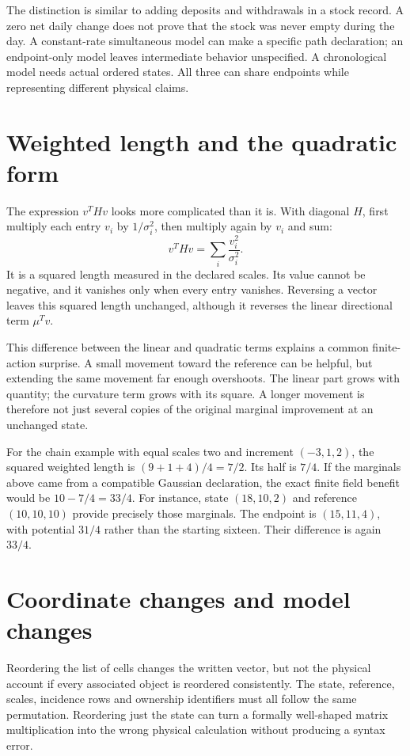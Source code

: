 The distinction is similar to adding deposits and withdrawals in a stock
record. A zero net daily change does not prove that the stock was never
empty during the day. A constant-rate simultaneous model can make a
specific path declaration; an endpoint-only model leaves intermediate
behavior unspecified. A chronological model needs actual ordered states.
All three can share endpoints while representing different physical claims.

\section{Weighted length and the quadratic form}
The expression $v^THv$ looks more complicated than it is. With diagonal
$H$, first multiply each entry $v_i$ by $1/\sigma_i^2$, then multiply
again by $v_i$ and sum:
\begin{equation}
 v^THv=\sum_i\frac{v_i^2}{\sigma_i^2}.
\end{equation}
It is a squared length measured in the declared scales. Its value cannot
be negative, and it vanishes only when every entry vanishes. Reversing a
vector leaves this squared length unchanged, although it reverses the
linear directional term $\mu^Tv$.

This difference between the linear and quadratic terms explains a common
finite-action surprise. A small movement toward the reference can be
helpful, but extending the same movement far enough overshoots. The linear
part grows with quantity; the curvature term grows with its square. A
longer movement is therefore not just several copies of the original
marginal improvement at an unchanged state.

For the chain example with equal scales two and increment $(-3,1,2)$,
the squared weighted length is $(9+1+4)/4=7/2$. Its half is $7/4$.
If the marginals above came from a compatible Gaussian declaration,
the exact finite field benefit would be $10-7/4=33/4$. For instance,
state $(18,10,2)$ and reference $(10,10,10)$ provide precisely those
marginals. The endpoint is $(15,11,4)$, with potential $31/4$ rather
than the starting sixteen. Their difference is again $33/4$.

\section{Coordinate changes and model changes}
Reordering the list of cells changes the written vector, but not the
physical account if every associated object is reordered consistently.
The state, reference, scales, incidence rows and ownership identifiers
must all follow the same permutation. Reordering just the state can turn
a formally well-shaped matrix multiplication into the wrong physical
calculation without producing a syntax error.

